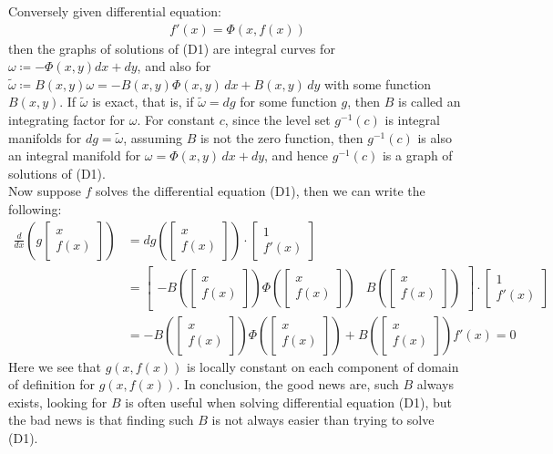 \documentclass[11pt,oneside]{book}
\theoremstyle{break}
\theoremstyle{break}
\newcommand{\that}[1]{\widetilde{#1}}
\newcommand{\bmat}[1]{\begin{bmatrix} #1 \end{bmatrix}}
\begin{document}
Conversely given differential equation: 
\begin{align*}
f'(x) = \Phi(x,f(x)) \tag{D1}
\end{align*}
then the graphs of solutions of (D1) are integral curves for $\omega \coloneqq -\Phi(x,y)dx+dy$, and also for $\that{\omega} \coloneqq B(x,y) \omega = -B(x,y)\Phi(x,y)\, dx + B(x,y)\, dy$ with some function $B(x,y)$. If $\that{\omega}$ is exact, that is, if $\that{\omega} = dg$ for some function $g$, then $B$ is called an integrating factor for $\omega$. For constant $c$, since the level set $g^{-1}(c)$ is integral manifolds for $dg = \that{\omega}$, assuming $B$ is not the zero function, then $g^{-1}(c)$ is also an integral manifold for $\omega = \Phi(x,y)\, dx + dy$, and hence $g^{-1}(c)$ is a graph of solutions of (D1).\\

Now suppose $f$ solves the differential equation (D1), then we can write the following:
\begin{align*}
\frac{d}{dx} \left( g\bmat{x \\ f(x)}\right) &= dg\left(\bmat{x\\ f(x)}\right) \cdot \bmat{1 \\ f'(x)} \\
&= \bmat{-B\left(\bmat{x \\ f(x)} \right)\Phi\left(\bmat{x \\ f(x)} \right) & B\left(\bmat{x \\ f(x)} \right)} \cdot \bmat{1 \\ f'(x)} \\
&= -B\left(\bmat{x\\ f(x)}\right) \Phi\left( \bmat{x\\f(x)}\right) + B\left( \bmat{x\\ f(x)}\right) f'(x) = 0
\end{align*}
Here we see that $g(x,f(x))$ is locally constant on each component of domain of definition for $g(x,f(x))$. In conclusion, the good news are, such $B$ always exists, looking for $B$ is often useful when solving differential equation (D1), but the bad news is that finding such $B$ is not always easier than trying to solve (D1). \\
\end{document}
